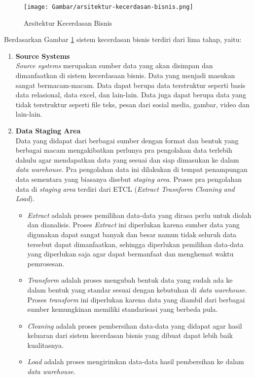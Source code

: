 \begin{figure}
	\centering
	\texttt{[image: Gambar/arsitektur-kecerdasan-bisnis.png]}
	\caption[Arsitektur Kecerdasan Bisnis]{Arsitektur Kecerdasan Bisnis} 
	\label{fig:arsitektur_kecerdasan_bisnis_fig}
\end{figure}

Berdasarkan Gambar \ref{fig:arsitektur_kecerdasan_bisnis_fig} sistem kecerdasan bisnis terdiri dari lima tahap, yaitu:

\begin{enumerate}
	\item \textbf{Source Systems}\\
	\textit{Source systems} merupakan sumber data yang akan disimpan dan dimanfaatkan di sistem kecerdasaan bisnis. Data yang menjadi masukan sangat bermacam-macam. Data dapat berupa data terstruktur seperti basis data relasional, data excel, dan lain-lain. Data juga dapat berupa data yang tidak terstruktur seperti file teks, pesan dari sosial media, gambar, video dan lain-lain.
	
	\item \textbf{Data Staging Area}\\
	Data yang didapat dari berbagai sumber dengan format dan bentuk yang berbagai macam mengakibatkan perlunya pra pengolahan data terlebih dahulu agar mendapatkan data yang sesuai dan siap dimasukan ke dalam \textit{data warehouse}. Pra pengolahan data ini dilakukan di tempat penampungan data sementara yang biasanya disebut \textit{staging area}. Proses pra pengolahan data di \textit{staging area} terdiri dari ETCL (\textit{Extract Trasnform Cleaning and Load}).
		\begin{itemize}
			\item \textit{Extract} adalah proses pemilihan data-data yang dirasa perlu untuk diolah dan dianalisis. Proses \textit{Extract} ini diperlukan karena sumber data yang digunakan dapat sangat banyak dan besar namun tidak seluruh data tersebut dapat dimanfaatkan, sehingga diperlukan pemilihan data-data yang diperlukan saja agar dapat bermanfaat dan menghemat waktu pemrosesan.
			\item \textit{Transform} adalah proses mengubah bentuk data yang sudah ada ke dalam bentuk yang standar sesuai dengan kebutuhan di \textit{data warehouse}. Proses \textit{transform} ini diperlukan karena data yang diambil dari berbagai sumber kemungkinan memiliki standarisasi yang berbeda pula.
			\item \textit{Cleaning} adalah proses pembersihan data-data yang didapat agar hasil keluaran dari sistem kecerdasan bisnis yang dibuat dapat lebih baik kualitasnya.
			\item \textit{Load} adalah proses mengirimkan data-data hasil pembersihan ke dalam \textit{data warehouse}.
		\end{itemize}
	

\end{enumerate}
